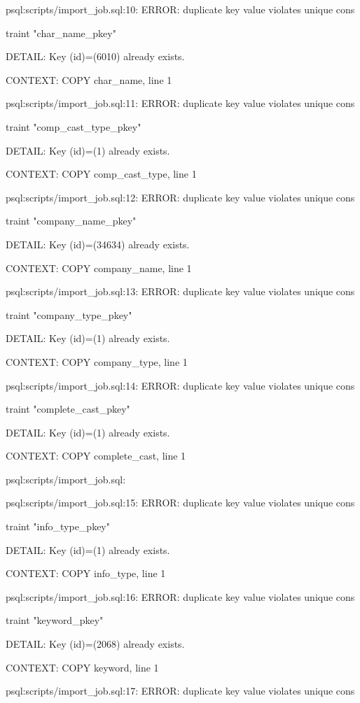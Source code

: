 \documentclass[11pt,a4paper]{article}
\begin{document}
psql:scripts/import\_job.sql:10: ERROR:  duplicate key value violates unique cons

traint "char\_name\_pkey"

DETAIL:  Key (id)=(6010) already exists.

CONTEXT:  COPY char\_name, line 1

psql:scripts/import\_job.sql:11: ERROR:  duplicate key value violates unique cons

traint "comp\_cast\_type\_pkey"

DETAIL:  Key (id)=(1) already exists.

CONTEXT:  COPY comp\_cast\_type, line 1

psql:scripts/import\_job.sql:12: ERROR:  duplicate key value violates unique cons

traint "company\_name\_pkey"

DETAIL:  Key (id)=(34634) already exists.

CONTEXT:  COPY company\_name, line 1

psql:scripts/import\_job.sql:13: ERROR:  duplicate key value violates unique cons

traint "company\_type\_pkey"

DETAIL:  Key (id)=(1) already exists.

CONTEXT:  COPY company\_type, line 1

psql:scripts/import\_job.sql:14: ERROR:  duplicate key value violates unique cons

traint "complete\_cast\_pkey"

DETAIL:  Key (id)=(1) already exists.

CONTEXT:  COPY complete\_cast, line 1

psql:scripts/import\_job.sql:

psql:scripts/import\_job.sql:15: ERROR:  duplicate key value violates unique cons

traint "info\_type\_pkey"

DETAIL:  Key (id)=(1) already exists.

CONTEXT:  COPY info\_type, line 1

psql:scripts/import\_job.sql:16: ERROR:  duplicate key value violates unique cons

traint "keyword\_pkey"

DETAIL:  Key (id)=(2068) already exists.

CONTEXT:  COPY keyword, line 1

psql:scripts/import\_job.sql:17: ERROR:  duplicate key value violates unique cons
\end{document}
